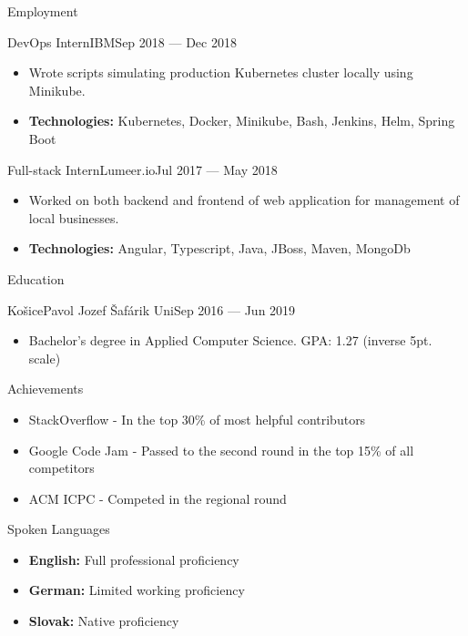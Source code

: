 \documentclass[]{style}
\begin{document}
\begin{cvsection}{Employment}
    	\begin{cvsubsection}{DevOps Intern}{IBM}{Sep 2018 — Dec 2018}
			\begin{itemize}
			    \item Wrote scripts simulating production Kubernetes cluster locally using Minikube.
			    \item \textbf{Technologies:} Kubernetes, Docker, Minikube, Bash, Jenkins, Helm, Spring Boot
			\end{itemize}
		\end{cvsubsection}
		
		\begin{cvsubsection}{Full-stack Intern}{Lumeer.io}{Jul 2017 — May 2018}
			\begin{itemize}
			    \item Worked on both backend and frontend of web application for management of local businesses.
				\item \textbf{Technologies:} Angular, Typescript, Java, JBoss, Maven, MongoDb
			\end{itemize}
		\end{cvsubsection}
	\end{cvsection}
	
	\begin{cvsection}{Education}
		\begin{cvsubsection}{Košice}{Pavol Jozef Šafárik Uni}{Sep 2016 — Jun 2019}
			\begin{itemize}
				\item Bachelor's degree in Applied Computer Science. GPA: 1.27 (inverse 5pt. scale)
			\end{itemize}
		\end{cvsubsection}
	\end{cvsection}

	\begin{cvsection}{Achievements}
	    \begin{cvsubsection}{}{}{}
			\begin{itemize}
			    \item StackOverflow - In the top 30\% of most helpful contributors
			    \item Google Code Jam  - Passed to the second round in the top 15\% of all competitors
			    \item ACM ICPC - Competed in the regional round
			\end{itemize}
		\end{cvsubsection}

	\end{cvsection}
	
	\begin{cvsection}{Spoken Languages}
		\begin{cvsubsection}{}{}{}	
			\begin{itemize}
                \item \textbf{English:} Full professional proficiency
                \item \textbf{German:} Limited working proficiency
                \item \textbf{Slovak:} Native proficiency
			\end{itemize}
		\end{cvsubsection}
	\end{cvsection}
	
\end{document}
